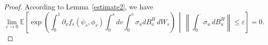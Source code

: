 \documentclass[10pt,a4paper]{amsart}
\begin{document}
\begin{proof}
According to Lemma~\ref{estimate2}, we have
\begin{equation*}
    \lim_{\varepsilon\to 0} \mathbb{E} \left[ \exp \left( \int_0^1 \partial_x f_s(\psi_s,\phi_s) \int_0^s dv \int_0^v \sigma_u dB^H_u \, dW_s \right) \,\middle|\, \left\| \int_0^\cdot \sigma_u \, dB^H_u \right\| \leq \varepsilon \right] = 0.
\end{equation*}
\end{proof}
\end{document}
